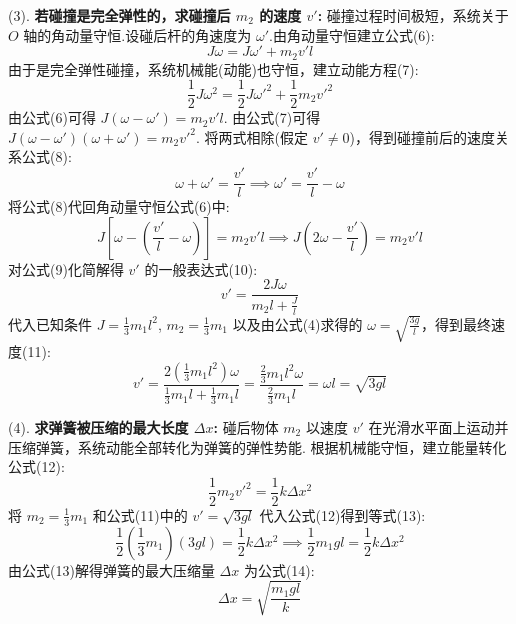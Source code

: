 (3). \textbf{若碰撞是完全弹性的，求碰撞后 $m_2$ 的速度 $v'$:}
碰撞过程时间极短，系统关于 $O$ 轴的角动量守恒.设碰后杆的角速度为 $\omega'$.由角动量守恒建立公式(6):
\begin{equation}
	J\omega = J\omega' + m_2 v' l
\end{equation}
由于是完全弹性碰撞，系统机械能(动能)也守恒，建立动能方程(7):
\begin{equation}
	\frac{1}{2}J\omega^2 = \frac{1}{2}J\omega'^2 + \frac{1}{2}m_2 v'^2
\end{equation}
由公式(6)可得 $J(\omega - \omega') = m_2 v' l$.
由公式(7)可得 $J(\omega - \omega')(\omega + \omega') = m_2 v'^2$.
将两式相除(假定 $v' \neq 0$)，得到碰撞前后的速度关系公式(8):
\begin{equation}
	\omega + \omega' = \frac{v'}{l} \implies \omega' = \frac{v'}{l} - \omega
\end{equation}
将公式(8)代回角动量守恒公式(6)中:
\begin{equation}
	J\left[\omega - \left(\frac{v'}{l} - \omega\right)\right] = m_2 v' l \implies J\left(2\omega - \frac{v'}{l}\right) = m_2 v' l
\end{equation}
对公式(9)化简解得 $v'$ 的一般表达式(10):
\begin{equation}
	v' = \frac{2J\omega}{m_2 l + \frac{J}{l}}
\end{equation}
代入已知条件 $J = \frac{1}{3}m_1 l^2$, $m_2 = \frac{1}{3}m_1$ 以及由公式(4)求得的 $\omega = \sqrt{\frac{3g}{l}}$，得到最终速度(11):
\begin{equation}
	v' = \frac{2\left(\frac{1}{3}m_1 l^2\right)\omega}{\frac{1}{3}m_1 l + \frac{1}{3}m_1 l} = \frac{\frac{2}{3}m_1 l^2 \omega}{\frac{2}{3}m_1 l} = \omega l = \sqrt{3gl}
\end{equation}

(4). \textbf{求弹簧被压缩的最大长度 $\Delta x$:}
碰后物体 $m_2$ 以速度 $v'$ 在光滑水平面上运动并压缩弹簧，系统动能全部转化为弹簧的弹性势能.
根据机械能守恒，建立能量转化公式(12):
\begin{equation}
	\frac{1}{2}m_2 v'^2 = \frac{1}{2}k \Delta x^2
\end{equation}
将 $m_2 = \frac{1}{3}m_1$ 和公式(11)中的 $v' = \sqrt{3gl}$ 代入公式(12)得到等式(13):
\begin{equation}
	\frac{1}{2}\left(\frac{1}{3}m_1\right)(3gl) = \frac{1}{2}k \Delta x^2 \implies \frac{1}{2}m_1 g l = \frac{1}{2}k \Delta x^2
\end{equation}
由公式(13)解得弹簧的最大压缩量 $\Delta x$ 为公式(14):
\begin{equation}
	\Delta x = \sqrt{\frac{m_1 g l}{k}}
\end{equation}

